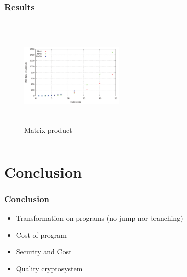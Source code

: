\documentclass{beamer}
\begin{document}
\begin{frame} \frametitle{Results}
 \begin{columns}
\begin{column}[c]{3cm}
\begin{figure}%
\vspace{-3ex}
\centering
\includegraphics[width=5cm, height=5cm]{f9.pdf} 
\caption{Matrix product} 
\end{figure}
\end{column}
\begin{column}[c]{4cm}
\begin{table}
\caption{Wall time for Odd-Even Merge Sort}
\end{table}
\end{column}
\end{columns}
\end{frame}

\section[Conclusion]{Conclusion}

\begin{frame}
  \frametitle{Conclusion}
  \begin{itemize}
  \item Transformation on programs (no jump nor branching)

  \item Cost of program

  \item Security and Cost

  \item Quality cryptosystem
  \end{itemize}
\end{frame}
\end{document}
